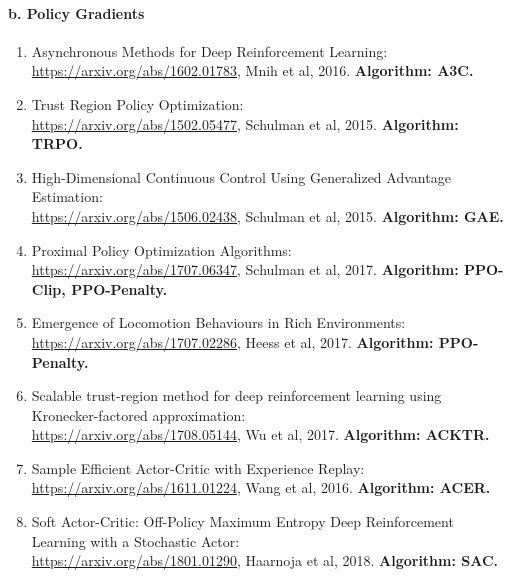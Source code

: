 \documentclass[lang=cn,11pt,a4paper]{eleganttemplate}
\begin{document}
\paragraph{b. Policy Gradients}
\begin{enumerate}
    \item Asynchronous Methods for Deep Reinforcement Learning:\\ \href{https://arxiv.org/abs/1602.01783}{https://arxiv.org/abs/1602.01783}, Mnih et al, 2016. \textbf{Algorithm: A3C.}
    \item Trust Region Policy Optimization:\\ \href{https://arxiv.org/abs/1502.05477}{https://arxiv.org/abs/1502.05477}, Schulman et al, 2015. \textbf{Algorithm: TRPO.}
    \item High-Dimensional Continuous Control Using Generalized Advantage Estimation:\\ \href{https://arxiv.org/abs/1506.02438}{https://arxiv.org/abs/1506.02438}, Schulman et al, 2015. \textbf{Algorithm: GAE.}
    \item Proximal Policy Optimization Algorithms:\\ \href{https://arxiv.org/abs/1707.06347}{https://arxiv.org/abs/1707.06347}, Schulman et al, 2017. \textbf{Algorithm: PPO-Clip, PPO-Penalty.}
    \item Emergence of Locomotion Behaviours in Rich Environments:\\ \href{https://arxiv.org/abs/1707.02286}{https://arxiv.org/abs/1707.02286}, Heess et al, 2017. \textbf{Algorithm: PPO-Penalty.}
    \item Scalable trust-region method for deep reinforcement learning using Kronecker-factored approximation:\\ \href{https://arxiv.org/abs/1708.05144}{https://arxiv.org/abs/1708.05144}, Wu et al, 2017. \textbf{Algorithm: ACKTR.}
    \item Sample Efficient Actor-Critic with Experience Replay:\\ \href{https://arxiv.org/abs/1611.01224}{https://arxiv.org/abs/1611.01224}, Wang et al, 2016. \textbf{Algorithm: ACER.}
    \item Soft Actor-Critic: Off-Policy Maximum Entropy Deep Reinforcement Learning with a Stochastic Actor:\\ \href{https://arxiv.org/abs/1801.01290}{https://arxiv.org/abs/1801.01290}, Haarnoja et al, 2018. \textbf{Algorithm: SAC.}
\end{enumerate}
\end{document}
